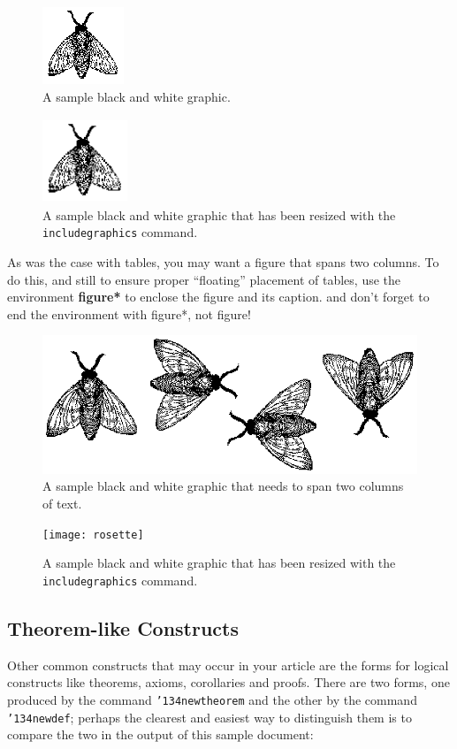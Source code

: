 \documentclass{sig-alternate-05-2015}
\begin{document}
\begin{figure}
\centering
\includegraphics{fly}
\caption{A sample black and white graphic.}
\end{figure}

\begin{figure}
\centering
\includegraphics[height=1in, width=1in]{fly}
\caption{A sample black and white graphic
that has been resized with the \texttt{includegraphics} command.}
\end{figure}


As was the case with tables, you may want a figure
that spans two columns.  To do this, and still to
ensure proper ``floating'' placement of tables, use the environment
\textbf{figure*} to enclose the figure and its caption.
and don't forget to end the environment with
{figure*}, not {figure}!

\begin{figure}
\centering
\includegraphics{flies}
\caption{A sample black and white graphic
that needs to span two columns of text.}
\end{figure}


\begin{figure}
\centering
\texttt{[image: rosette]}
\caption{A sample black and white graphic that has
been resized with the \texttt{includegraphics} command.}
\vskip -6pt
\end{figure}

\subsection{Theorem-like Constructs}
Other common constructs that may occur in your article are
the forms for logical constructs like theorems, axioms,
corollaries and proofs.  There are
two forms, one produced by the
command \texttt{{\char'134}newtheorem} and the
other by the command \texttt{{\char'134}newdef}; perhaps
the clearest and easiest way to distinguish them is
to compare the two in the output of this sample document:
\end{document}
